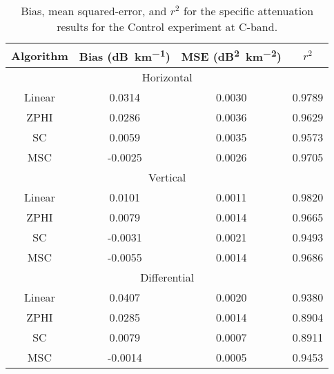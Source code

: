 \begin{table}
    \centering
    \begin{tabular}{| c | c | c | c |}
        \hline
        Algorithm & Bias (\si{dB\per \kilo\meter}) & MSE (\si{dB\squared \per \kilo\meter \squared}) & $r^2$ \\
        \hline
        \hline
        \multicolumn{4}{|c|}{Horizontal}\\
        \hline
        Linear & 0.0314 & 0.0030 & 0.9789\\
        ZPHI & 0.0286 & 0.0036 & 0.9629\\
        SC & 0.0059 & 0.0035 & 0.9573\\
        MSC & -0.0025 & 0.0026 & 0.9705\\
        \hline
        \multicolumn{4}{|c|}{Vertical}\\
        \hline
        Linear & 0.0101 & 0.0011 & 0.9820\\
        ZPHI & 0.0079 & 0.0014 & 0.9665\\
        SC & -0.0031 & 0.0021 & 0.9493\\
        MSC & -0.0055 & 0.0014 & 0.9686\\
        \hline
        \multicolumn{4}{|c|}{Differential}\\
        \hline
        Linear & 0.0407 & 0.0020 & 0.9380\\
        ZPHI & 0.0285 & 0.0014 & 0.8904\\
        SC & 0.0079 & 0.0007 & 0.8911\\
        MSC & -0.0014 & 0.0005 & 0.9453\\
\hline
    \end{tabular}
    \caption{Bias, mean squared-error, and $r^2$ for the specific attenuation
    results for the Control experiment at C-band.}
    \label{tab:C-stats-Control}
\end{table}
